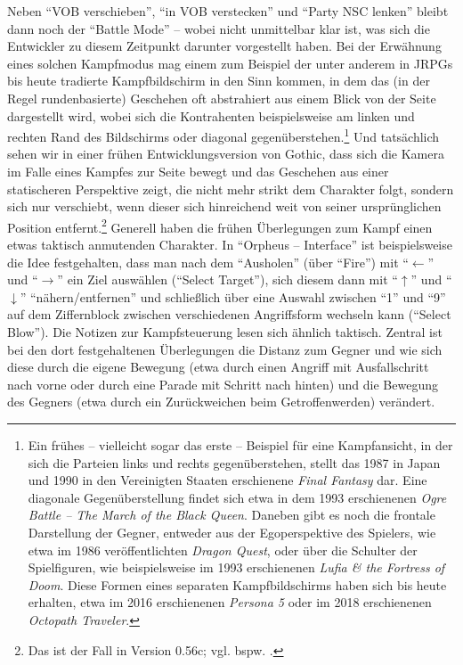 \documentclass[a5paper,pagesize,numbers=noenddot]{scrbook}
\begin{document}
Neben \enquote{VOB verschieben}, \enquote{in VOB verstecken} und \enquote{Party NSC lenken} bleibt dann noch der \enquote{Battle Mode} -- wobei nicht unmittelbar klar ist, was sich die Entwickler zu diesem Zeitpunkt darunter vorgestellt haben.
Bei der Erwähnung eines solchen Kampfmodus mag einem zum Beispiel der unter anderem in JRPGs bis heute tradierte Kampfbildschirm in den Sinn kommen, in dem das (in der Regel rundenbasierte) Geschehen oft abstrahiert aus einem Blick von der Seite dargestellt wird, wobei sich die Kontrahenten beispielsweise am linken und rechten Rand des Bildschirms oder diagonal gegenüberstehen.\footnote{Ein frühes -- vielleicht sogar das erste -- Beispiel für eine Kampfansicht, in der sich die Parteien links und rechts gegenüberstehen, stellt das 1987 in Japan und 1990 in den Vereinigten Staaten erschienene \textit{Final Fantasy} dar.
Eine diagonale Gegenüberstellung findet sich etwa in dem 1993 erschienenen \textit{Ogre Battle -- The March of the Black Queen}. Daneben gibt es noch die frontale Darstellung der Gegner, entweder aus der Egoperspektive des Spielers, wie etwa im 1986 veröffentlichten \textit{Dragon Quest}, oder über die Schulter der Spielfiguren, wie beispielsweise im 1993 erschienenen \textit{Lufia \& the Fortress of Doom}. Diese Formen eines separaten Kampfbildschirms haben sich bis heute erhalten, etwa im 2016 erschienenen \textit{Persona 5} oder im 2018 erschienenen \textit{Octopath Traveler}.}
Und tatsächlich sehen wir in einer frühen Entwicklungsversion von Gothic, dass sich die Kamera im Falle eines Kampfes zur Seite bewegt und das Geschehen aus einer statischeren Perspektive zeigt, die nicht mehr strikt dem Charakter folgt, sondern sich nur verschiebt, wenn dieser sich hinreichend weit von seiner ursprünglichen Position entfernt.\footnote{Das ist der Fall in Version 0.56c; vgl. bspw. \autocite[Min.~5:11]{alpha_features_2023}.}
Generell haben die frühen Überlegungen zum Kampf einen etwas taktisch anmutenden Charakter.
In \enquote{Orpheus -- Interface} ist beispielsweise die Idee festgehalten, dass man nach dem \enquote{Ausholen} (über \enquote{Fire}) mit \enquote{$\leftarrow$} und \enquote{$\rightarrow$} ein Ziel auswählen (\enquote{Select Target}), sich diesem dann mit \enquote{$\uparrow$} und \enquote{$\downarrow$} \enquote{nähern/entfernen} und schließlich über eine Auswahl zwischen \enquote{1} und \enquote{9} auf dem Ziffernblock zwischen verschiedenen Angriffsform wechseln kann (\enquote{Select Blow}).\autocite[S.~2]{orpheus_interface}
Die Notizen zur Kampfsteuerung lesen sich ähnlich taktisch.
Zentral ist bei den dort festgehaltenen Überlegungen die Distanz zum Gegner und wie sich diese durch die eigene Bewegung (etwa durch einen Angriff mit Ausfallschritt nach vorne oder durch eine Parade mit Schritt nach hinten) und die Bewegung des Gegners (etwa durch ein Zurückweichen beim Getroffenwerden) verändert.\autocite[Vgl.][S.~1--3]{orpheus_kampfsteuerung}
\end{document}

